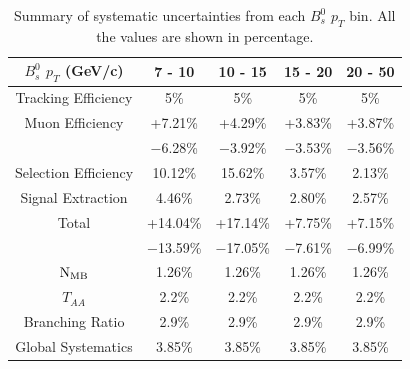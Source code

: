 \begin{table}[h]
\begin{center}
\caption{Summary of systematic uncertainties from each $B^0_s$ $p_T$ bin. All the values are shown in percentage.}
\vspace{1em}
\label{BsPtSystSum}
\begin{tabular}{ |c | c | c | c | c|}
\hline
$B^0_s$ $p_T$ (GeV/c) &  7 - 10 & 10 - 15 & 15 - 20 & 20 - 50  \\
\hline
Tracking Efficiency & 5\% & 5\% & 5\% & 5\% \\
Muon Efficiency     & +7.21\% & +4.29\% & +3.83\% & +3.87\% \\
                                & $-$6.28\% & $-$3.92\% & $-$3.53\% & $-$3.56\% \\
Selection Efficiency & 10.12\%  & 15.62\%  & 3.57\% & 2.13\%  \\
Signal Extraction & 4.46\%  & 2.73\% & 2.80\%  & 2.57\% \\
Total  & +14.04\% &  +17.14\% &  +7.75\% & +7.15\%  \\
      	 & $-$13.59\% &  $-$17.05\% &  $-$7.61\% &  $-$6.99\%  \\
\hline
 \hline
$\rm{N_{MB}} $ & 1.26\% & 1.26\% & 1.26\% & 1.26\% \\
$T_{AA}$ & 2.2\% & 2.2\% & 2.2\% & 2.2\% \\
Branching Ratio & 2.9\% & 2.9\% & 2.9\%& 2.9\%\\
Global Systematics & 3.85\% & 3.85\% & 3.85\%& 3.85\%\\
 \hline
\end{tabular}
\end{center}
\end{table}



